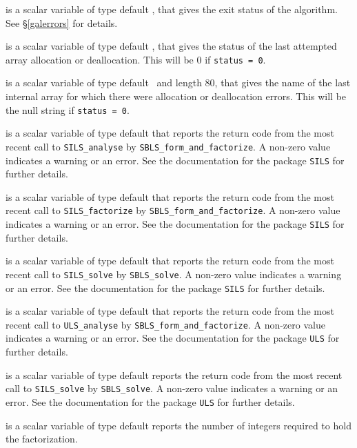 \documentclass{galahad}
\newcommand{\packagename}{SBLS}
\begin{document}
\begin{description}

 is a scalar variable of type default \integer, that gives the
exit status of the algorithm. 
See \S\ref{galerrors} 
for details.

 is a scalar variable of type default \integer, that gives
the status of the last attempted array allocation or deallocation.
This will be 0 if {\tt status = 0}.

 is a scalar variable of type default \character\
and length 80, that  gives the name of the last internal array 
for which there were allocation or deallocation errors.
This will be the null string if {\tt status = 0}. 

 is a scalar variable of type default \integer
that reports the return code from the most recent call to {\tt SILS\_analyse}
by {\tt \packagename\_form\_and\_factorize}. A non-zero value indicates
a warning or an error. See the documentation for the package {\tt SILS} 
for further details.

 is a scalar variable of type default \integer
that reports the return code from the most recent call to {\tt SILS\_factorize}
by {\tt \packagename\_form\_and\_factorize}. A non-zero value indicates
a warning or an error. See the documentation for the package {\tt SILS} 
for further details.

 is a scalar variable of type default \integer
that reports the return code from the most recent call to {\tt SILS\_solve}
by {\tt \packagename\_solve}. A non-zero value indicates
a warning or an error. See the documentation for the package {\tt SILS} 
for further details.

 is a scalar variable of type default \integer
that reports the return code from the most recent call to {\tt ULS\_analyse}
by {\tt \packagename\_form\_and\_factorize}. A non-zero value indicates
a warning or an error. See the documentation for the package {\tt ULS} 
for further details.

 is a scalar variable of type default \integer
reports the return code from the most recent call to {\tt SILS\_solve}
by {\tt \packagename\_solve}. A non-zero value indicates
a warning or an error. See the documentation for the package {\tt ULS} 
for further details.

 is a scalar variable of type default \integer
reports the number of integers required to hold the factorization.


\end{description}
\end{document}
